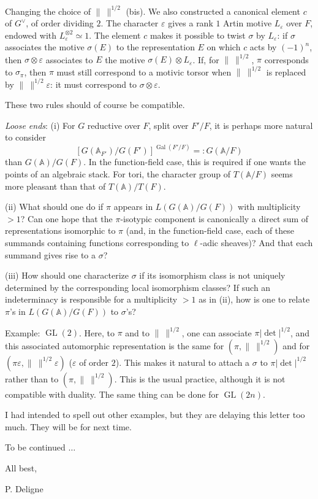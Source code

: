 \documentclass[11pt]{article}
\newcommand{\GL}{\operatorname{GL}}
\newcommand{\Gal}{\operatorname{Gal}}
\newcommand{\normchar}{\|\ \|}
\begin{document}
Changing the choice of \(\normchar^{1/2}\) (bis). We also constructed a canonical element \(c\) of \(G^\vee\), of order dividing \(2\). The character \(\varepsilon\) gives a rank \(1\) Artin motive \(L_\varepsilon\) over \(F\), endowed with \(L_\varepsilon^{\otimes2}\simeq1\). The element \(c\) makes it possible to twist \(\sigma\) by \(L_\varepsilon\): if \(\sigma\) associates the motive \(\sigma(E)\) to the representation \(E\) on which \(c\) acts by \((-1)^n\), then \(\sigma\otimes\varepsilon\) associates to \(E\) the motive \(\sigma(E)\otimes L_\varepsilon\). If, for \(\normchar^{1/2}\), \(\pi\) corresponds to \(\sigma_\pi\), then \(\pi\) must still correspond to a motivic torsor when \(\normchar^{1/2}\) is replaced by \(\normchar^{1/2}\varepsilon\): it must correspond to \(\sigma\otimes\varepsilon\).

These two rules should of course be compatible.

\textit{Loose ends}: (i) For \(G\) reductive over \(F\), split over \(F'/F\), it is perhaps more natural to consider
\[
[G(\mathbb A_{F'})/G(F')]^{\Gal(F'/F)}=:G(\mathbb A/F)
\]
than \(G(\mathbb A)/G(F)\). In the function-field case, this is required if one wants the points of an algebraic stack. For tori, the character group of \(T(\mathbb A/F)\) seems more pleasant than that of \(T(\mathbb A)/T(F)\).

(ii) What should one do if \(\pi\) appears in \(L(G(\mathbb A)/G(F))\) with multiplicity \(>1\)? Can one hope that the \(\pi\)-isotypic component is canonically a direct sum of representations isomorphic to \(\pi\) (and, in the function-field case, each of these summands containing functions corresponding to \(\ell\)-adic sheaves)? And that each summand gives rise to a \(\sigma\)?

(iii) How should one characterize \(\sigma\) if its isomorphism class is not uniquely determined by the corresponding local isomorphism classes? If such an indeterminacy is responsible for a multiplicity \(>1\) as in (ii), how is one to relate \(\pi\)'s in \(L(G(\mathbb A)/G(F))\) to \(\sigma\)'s?

Example: \(\GL(2)\). Here, to \(\pi\) and to \(\normchar^{1/2}\), one can associate \(\pi|\det|^{1/2}\), and this associated automorphic representation is the same for \((\pi,\normchar^{1/2})\) and for \((\pi\varepsilon,\normchar^{1/2}\varepsilon)\) (\(\varepsilon\) of order \(2\)). This makes it natural to attach a \(\sigma\) to \(\pi|\det|^{1/2}\) rather than to \((\pi,\normchar^{1/2})\). This is the usual practice, although it is not compatible with duality. The same thing can be done for \(\GL(2n)\).

I had intended to spell out other examples, but they are delaying this letter too much. They will be for next time.

\begin{center}
To be continued \(\ldots\)

All best,

P. Deligne
\end{center}
\end{document}
